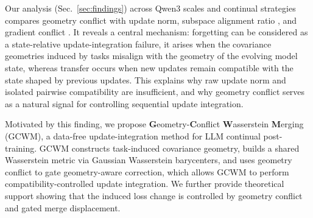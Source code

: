 \documentclass{article}
\begin{document}
\vspace{-0.1em}
Our analysis (Sec.~\ref{sec:findings}) across Qwen3 scales and continual strategies compares geometry conflict with update norm, subspace alignment ratio \cite{gargiulo2025task}, and gradient conflict \cite{wang2021gradient}.
It reveals a central mechanism: forgetting can be considered as a state-relative update-integration failure, it arises when the covariance geometries induced by tasks misalign with the geometry of the evolving model state, 
whereas transfer occurs when new updates remain compatible with the state shaped by previous updates.
This explains why raw update norm and isolated pairwise compatibility are insufficient, and why geometry conflict serves as a natural signal for controlling sequential update integration.

\vspace{-0.1em}
Motivated by this finding, we propose \textbf{G}eometry-\textbf{C}onflict \textbf{W}asserstein \textbf{M}erging (GCWM), a data-free update-integration method for LLM continual post-training. 
GCWM constructs task-induced covariance geometry, builds a shared Wasserstein metric via Gaussian Wasserstein barycenters, and uses geometry conflict to gate geometry-aware correction, which allows GCWM to perform compatibility-controlled update integration.
We further provide theoretical support showing that the induced loss change is controlled by geometry conflict and gated merge displacement.
\end{document}

